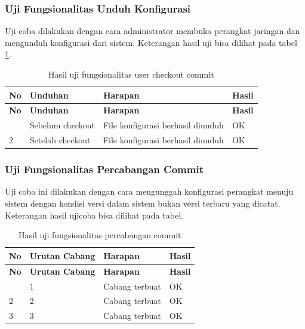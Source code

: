 	\subsubsection{Uji Fungsionalitas Unduh Konfigurasi}
	Uji coba dilakukan dengan cara administrator membuka perangkat jaringan dan mengunduh konfigurasi dari sistem. Keterangan hasil uji bisa dilihat pada tabel \ref{hasilUnduhKonfig}.
	\begin{longtable}{|p{}|p{}|p{}|p{}|}
		
		\caption{Hasil uji fungsionalitas user checkout commit} \label{hasilUnduhKonfig} \\
		\hline
		\textbf{No} & \textbf{Unduhan} & \textbf{Harapan} & \textbf{Hasil} \\ \hline
		\endfirsthead
		\hline
		\textbf{No} & \textbf{Unduhan} & \textbf{Harapan} & \textbf{Hasil} \\ \hline
		\endhead
		\endfoot
		\endlastfoot
		1 & Sebelum checkout & File konfigurasi berhasil diunduh & OK\\ \hline
		2 & Setelah checkout & File konfigurasi berhasil diunduh & OK\\ \hline
		
	\end{longtable}
	
	
	\subsubsection{Uji Fungsionalitas Percabangan Commit}
	Uji coba ini dilakukan dengan cara mengunggah konfigurasi perangkat menuju sistem dengan kondisi versi dalam sistem bukan versi terbaru yang dicatat. Keterangan hasil ujicoba bisa dilihat pada tabel.
	
	\begin{longtable}{|p{}|p{}|p{}|p{}|}
		
		\caption{Hasil uji fungsionalitas percabangan commit} \label{hasil precabangan commit} \\
		\hline
		\textbf{No} & \textbf{Urutan Cabang} & \textbf{Harapan} & \textbf{Hasil} \\ \hline
		\endfirsthead
		\hline
		\textbf{No} & \textbf{Urutan Cabang} & \textbf{Harapan} & \textbf{Hasil} \\ \hline
		\endhead
		\endfoot
		\endlastfoot
		1 & 1 & Cabang terbuat & OK\\ \hline
		2 & 2 & Cabang terbuat & OK\\ \hline
		3 & 3 & Cabang terbuat & OK\\ \hline
	\end{longtable}
	

